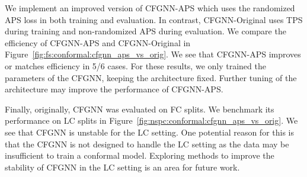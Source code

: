 We implement an improved version of CFGNN-APS which uses the randomized APS loss in both training and evaluation.
In contrast, CFGNN-Original uses TPS during training and non-randomized APS during evaluation.
We compare the efficiency of CFGNN-APS and CFGNN-Original in Figure~\ref{fig:fs:conformal:cfgnn_aps_vs_orig}.
We see that CFGNN-APS improves or matches efficiency in 5/6 cases.
For these results, we only trained the parameters of the CFGNN, keeping the architecture fixed.
Further tuning of the architecture may improve the performance of CFGNN-APS.

Finally, originally, CFGNN was evaluated on FC splits.
We benchmark its performance on LC splits in Figure~\ref{fig:nspc:conformal:cfgnn_aps_vs_orig}.
We see that CFGNN is unstable for the LC setting.
One potential reason for this is that the CFGNN is not designed to handle the LC setting as the data may be insufficient to train a conformal model.
Exploring methods to improve the stability of CFGNN in the LC setting is an area for future work.
